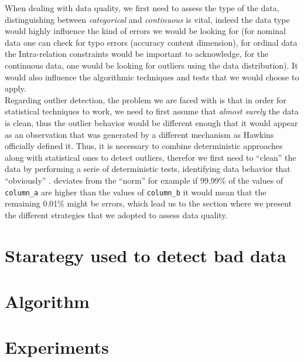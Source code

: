 \documentclass{article}
\begin{document}
When dealing with data quality, we first need to assess the type of the data, distinguishing between \textit{categorical} and \textit{continuous} is vital, indeed the data type would highly influence the kind of errors we would be looking for (for nominal data one can check for typo errors (accuracy content dimension), for ordinal data the Intra-relation constraints would be important to acknowledge, for the continuous data, one would be looking for outliers using the data distribution). It would also influence the algorithmic techniques and tests that we would choose to apply. \\
Regarding outlier detection, the problem we are faced with is that in order for statistical techniques to work, we need to first assume that 
\textit{almost surely} 
the data is clean, thus the outlier behavior would be different enough that it would appear as an observation that was generated by a different mechanism as Hawkins officially defined it. 
Thus, it is necessary to combine deterministic approaches along with statistical ones to detect outliers, therefor we first need to ``clean'' the data by performing a serie of deterministic tests, identifying data behavior that ``obviously'' .
deviates from the ``norm'' for example if 99.99\% of the values of \texttt{column\_a} are higher than the values of \texttt{column\_b} it would mean that the remaining 0.01\% might be errors, which lead us to the section where we present the different strategies that we adopted to assess data quality.
\section{Starategy used to detect bad data} 
\label{sec:Starategy used to detect bad data}




\section{Algorithm} %
\label{sec:Algorithm}




\section{Experiments} %
\label{sec:Experiments}
\end{document}
